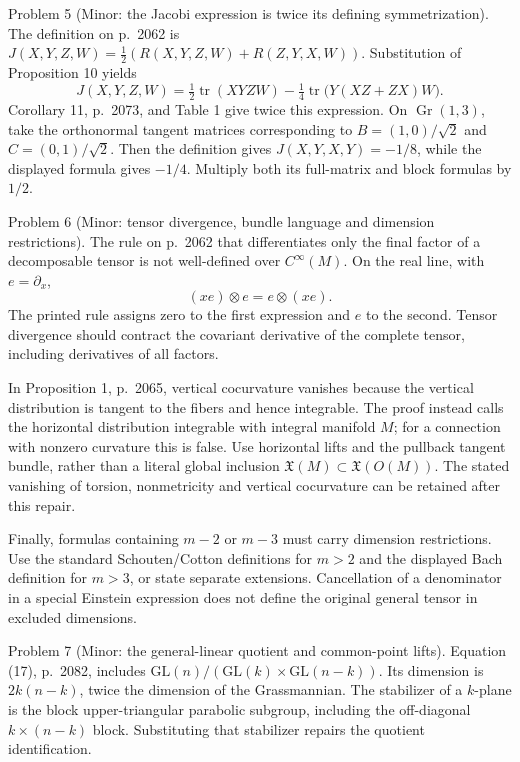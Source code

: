 \documentclass[10pt]{article}
\begin{document}
Problem 5 (Minor: the Jacobi expression is twice its defining symmetrization).  The definition on p. 2062 is \(J(X,Y,Z,W)=\tfrac12(R(X,Y,Z,W)+R(Z,Y,X,W))\). Substitution of Proposition 10 yields \[J(X,Y,Z,W)
 =\tfrac12\mathop{\mathrm{tr}}(XYZW)
       -\tfrac14\mathop{\mathrm{tr}}\bigl(Y(XZ+ZX)W\bigr).\] Corollary 11, p. 2073, and Table 1 give twice this expression. On \(\mathop{\mathrm{Gr}}(1,3)\), take the orthonormal tangent matrices corresponding to \(B=(1,0)/\sqrt2\) and \(C=(0,1)/\sqrt2\). Then the definition gives \(J(X,Y,X,Y)=-1/8\), while the displayed formula gives \(-1/4\). Multiply both its full-matrix and block formulas by \(1/2\).\par
Problem 6 (Minor: tensor divergence, bundle language and dimension restrictions).  The rule on p. 2062 that differentiates only the final factor of a decomposable tensor is not well-defined over \(C^\infty(M)\). On the real line, with \(e=\partial_x\), \[(xe)\otimes e=e\otimes(xe).\] The printed rule assigns zero to the first expression and \(e\) to the second. Tensor divergence should contract the covariant derivative of the complete tensor, including derivatives of all factors.\par
In Proposition 1, p. 2065, vertical cocurvature vanishes because the vertical distribution is tangent to the fibers and hence integrable. The proof instead calls the horizontal distribution integrable with integral manifold \(M\); for a connection with nonzero curvature this is false. Use horizontal lifts and the pullback tangent bundle, rather than a literal global inclusion \(\mathfrak X(M)\subset\mathfrak X(O(M))\). The stated vanishing of torsion, nonmetricity and vertical cocurvature can be retained after this repair.\par
Finally, formulas containing \(m-2\) or \(m-3\) must carry dimension restrictions. Use the standard Schouten/Cotton definitions for \(m>2\) and the displayed Bach definition for \(m>3\), or state separate extensions. Cancellation of a denominator in a special Einstein expression does not define the original general tensor in excluded dimensions.\par
Problem 7 (Minor: the general-linear quotient and common-point lifts).  Equation (17), p. 2082, includes \(\mathrm{GL}(n)/(\mathrm{GL}(k)\times\mathrm{GL}(n-k))\). Its dimension is \(2k(n-k)\), twice the dimension of the Grassmannian. The stabilizer of a \(k\)-plane is the block upper-triangular parabolic subgroup, including the off-diagonal \(k\times(n-k)\) block. Substituting that stabilizer repairs the quotient identification.\par
\end{document}
